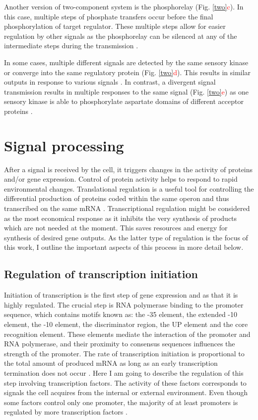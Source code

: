 Another version of two-component system is the phosphorelay (Fig. \ref{two}\textcolor{red}{c}).
In this case, multiple steps of phosphate transfers occur before the final phosphorylation of target regulator.
These multiple steps allow for easier regulation by other signals as the phosphorelay can be silenced at any of the intermediate steps during the transmission \cite{perego2001pentapeptide, groisman2016feedback}.

In some cases, multiple different signals are detected by the same sensory kinase or converge into the same regulatory protein (Fig. \ref{two}\textcolor{red}{d}).
This results in similar outputs in response to various signals \cite{kaczmarczyk2014complex, chambonnier2016hybrid}.
In contrast, a divergent signal transmission results in multiple responses to the same signal (Fig. \ref{two}\textcolor{red}{e}) as one sensory kinase is able to phosphorylate aspartate domains of different acceptor proteins \cite{mika2005two, groisman2016feedback}.

\section{Signal processing}
After a signal is received by the cell, it triggers changes in the activity of proteins and/or gene expression.
Control of protein activity helps to respond to rapid environmental changes. Translational regulation is a useful tool for controlling the differential production of proteins coded within the same operon and thus transcribed on the same mRNA \cite{dar2018extensive}.
Transcriptional regulation might be considered as the most economical response as it inhibits the very synthesis of products which are not needed at the moment.
This saves resources and energy for synthesis of desired gene outputs.
As the latter type of regulation is the focus of this work, I outline the important aspects of this process in more detail below.

\subsection{Regulation of transcription initiation}
Initiation of transcription is the first step of gene expression and as that it is highly regulated.
The crucial step is RNA polymerase binding to the promoter sequence, which contains motifs known as: the -35 element, the extended -10 element, the -10 element, the
discriminator region, the UP element and the core recognition element.
These elements mediate the interaction of the promoter and RNA polymerase, and their proximity to consensus sequences influences the strength of the promoter.
The rate of transcription initiation is proportional to the total amount of produced mRNA as long as an early transcription termination does not occur \cite{kennell1977transcription, iyer1996absolute}.
Here I am going to describe the regulation of this step involving transcription factors.
The activity of these factors corresponds to signals the cell acquires from the internal or external environment.
Even though some factors control only one promoter, the majority of at least  promoters is regulated by more transcription factors \cite{karp2014ecocyc}.

